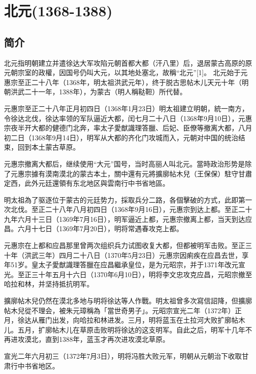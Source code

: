 
\section{北元\tiny(1368-1388)}

\subsection{简介}

北元指明朝建立并遣徐达大军攻陷元朝首都大都（汗八里）后，退居蒙古高原的原元朝宗室的政權，因国号仍叫大元，以其地处塞北，故稱“北元”[1]。 北元始于元惠宗至正二十八年（1368年，明太祖洪武元年），终于脱古思帖木儿天元十年（明朝洪武二十一年，1388年），为蒙古（明人稱鞑靼）所代替。

元惠宗至正二十八年正月初四日（1368年1月23日）明太祖建立明朝，統一南方，令徐达北伐，徐达率领的军队逼近大都，闰七月二十八日（1368年9月10日），元惠宗夜半开大都的健德门北奔，率太子愛猷識理答臘、后妃、臣僚等撤离大都，八月初二日（1368年9月14日），明军从大都的齐化门攻城而入，元朝对中国的统治结束，回到本土蒙古草原。

元惠宗撤离大都后，继续使用“大元”国号，当时高丽人叫北元。當時政治形势是除了元惠宗據有漠南漠北的蒙古本土，關中還有元將擴廓帖木兒（王保保）駐守甘肅定西，此外元廷還領有东北地区與雲南行中书省地區。

明太祖為了驱逐位于蒙古的元廷势力，採取兵分二路，各個擊破的方式，此即第一次北伐。至正二十八年八月初四日（1368年9月16日），元惠宗到达上都。至正二十九年六月十三日（1369年7月16日），明军逼近上都，元惠宗撤离上都，当天到达应昌。六月十七日（1369年7月20日），明将常遇春攻克上都。

元惠宗在上都和应昌那里曾两次组织兵力试图收复大都，但都被明军击败。至正三十年（洪武三年）四月二十八日（1370年5月23日）元惠宗因痢疾在应昌去世，享年51岁。皇太子愛猷識理答臘在应昌繼承皇位，是为元昭宗，并于1371年改元宣光。至正三十年五月十六日（1370年6月10日），明将李文忠攻克应昌，元昭宗撤至哈拉和林，并坚持抵抗明军。

擴廓帖木兒仍然在漠北多地与明将徐达等人作戰。明太祖曾多次寫信詔降，但擴廓帖木兒從不理会，被朱元璋稱為「當世奇男子」。元昭宗宣光二年（1372年）正月，徐达从雁门出发，向哈拉和林进发。三月，明将蓝玉在土拉河大败扩廓帖木儿。五月，扩廓帖木儿在草原击败明将徐达的这支明军。自此之后，明军十几年不再进攻漠北，直到1388年，蓝玉才再次进攻漠北草原。

宣光二年六月初三（1372年7月3日），明将冯胜大败元军，明朝从元朝治下收取甘肃行中书省地区。

